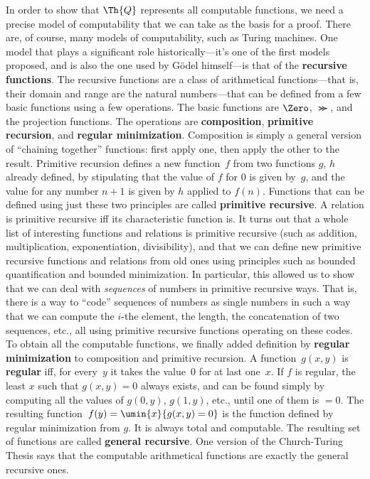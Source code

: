 In order to show that $\Th{Q}$ represents all computable functions, we
need a precise model of computability that we can take as the basis
for a proof.  There are, of course, many models of computability, such
as Turing machines. One model that plays a significant role
historically---it's one of the first models proposed, and is also the
one used by G\"odel himself---is that of the \textbf{recursive
  functions}.  The recursive functions are a class of arithmetical
functions---that is, their domain and range are the natural
numbers---that can be defined from a few basic functions using a few
operations. The basic functions are $\Zero$, $\Succ$, and the
projection functions. The operations are \textbf{composition},
\textbf{primitive recursion}, and \textbf{regular
  minimization}. Composition is simply a general version of ``chaining
together'' functions: first apply one, then apply the other to the
result. Primitive recursion defines a new function~$f$ from two
functions $g$, $h$ already defined, by stipulating that the value of
$f$ for $0$ is given by~$g$, and the value for any number $n+1$ is
given by $h$ applied to $f(n)$.  Functions that can be defined using
just these two principles are called \textbf{primitive recursive}. A
relation is primitive recursive iff its characteristic function is. It
turns out that a whole list of interesting functions and relations is
primitive recursive (such as addition, multiplication, exponentiation,
divisibility), and that we can define new primitive recursive
functions and relations from old ones using principles such as bounded
quantification and bounded minimization. In particular, this allowed
us to show that we can deal with \emph{sequences} of numbers in
primitive recursive ways. That is, there is a way to ``code''
sequences of numbers as single numbers in such a way that we can
compute the $i$-the element, the length, the concatenation of two
sequences, etc., all using primitive recursive functions operating on
these codes.  To obtain all the computable functions, we finally added
definition by \textbf{regular minimization} to composition and
primitive recursion.  A function~$g(x, y)$ is \textbf{regular} iff,
for every~$y$ it takes the value~$0$ for at last one~$x$. If $f$ is
regular, the least $x$ such that $g(x, y) = 0$ always exists, and can
be found simply by computing all the values of $g(0, y)$, $g(1, y)$,
etc., until one of them is $= 0$. The resulting function~$f(y) =
\umin{x}{g(x, y) = 0}$ is the function defined by regular minimization
from $g$. It is always total and computable. The resulting set of
functions are called \textbf{general recursive}.  One version of the
Church-Turing Thesis says that the computable arithmetical functions
are exactly the general recursive ones.
